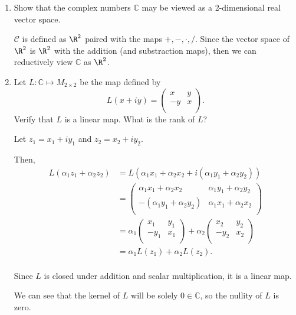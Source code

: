\documentclass{article}
\begin{document}
\begin{enumerate}[label=(\alph*)]
  \item Show that the complex numbers $\mathbb{C}$ may be viewed as a 2-dimensional real vector space. 

    $\mathcal{C}$ is defined as $\R^{2}$ paired with the maps $+,-,\cdot,/$. Since the vector space of $\R^{2}$ is $\R^{2}$ with the addition (and substraction maps), then we can reductively view $\mathbb{C}$ as $\R^{2}$.

  \item Let $L : \mathbb{C} \longmapsto M_{2\times 2}$ be the map defined by
    \[
      L(x+iy)=\begin{pmatrix} x&y\\-y&x\\ \end{pmatrix} 
    .\]
    Verify that $L$ is a linear map. What is the rank of $L$?

    Let $z_1=x_1+iy_1$ and $z_2=x_2+iy_2$.

    Then, 
    \begin{align*}
      L(\alpha_1 z_1 + \alpha_2 z_2) &= L(\alpha_1 x_1 + \alpha_2 x_2 + i(\alpha_1 y_1+\alpha_2 y_2)) \\
      &= \begin{pmatrix}
      \alpha_1 x_1 + \alpha_2 x_2 & \alpha_1 y_1+\alpha_2 y_2 \\
      -(\alpha_1 y_1+\alpha_2 y_2) & \alpha_1 x_1 + \alpha_2 x_2 \\
      \end{pmatrix}  \\
      &= \alpha_1 \begin{pmatrix} 
        x_1 & y_1 \\ -y_1 & x_1 \\
      \end{pmatrix} + \alpha_2 \begin{pmatrix} 
        x_2 & y_2 \\ -y_2 & x_2 \\
      \end{pmatrix} \\
      &= \alpha_1 L(z_1) + \alpha_2 L(z_2). \\
    \end{align*}

    Since $L$ is closed under addition and scalar multiplication, it is a linear map.

    We can see that the kernel of $L$ will be solely $0\in \mathbb{C}$, so the nullity of $L$ is zero. 


\end{enumerate}
\end{document}
